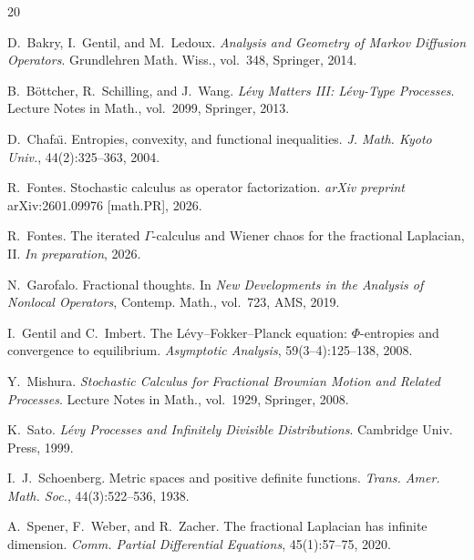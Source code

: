 \documentclass[11pt,a4paper]{article}
\theoremstyle{plain}
\theoremstyle{definition}
\theoremstyle{remark}
\begin{document}
\begin{thebibliography}{20}

D.~Bakry, I.~Gentil, and M.~Ledoux.
\newblock \emph{Analysis and Geometry of Markov Diffusion Operators}.
\newblock Grundlehren Math. Wiss., vol.~348, Springer, 2014.

B.~B\"ottcher, R.~Schilling, and J.~Wang.
\newblock \emph{L\'evy Matters III: L\'evy-Type Processes}.
\newblock Lecture Notes in Math., vol.~2099, Springer, 2013.

D.~Chafa\"{\i}.
\newblock Entropies, convexity, and functional inequalities.
\newblock \emph{J. Math. Kyoto Univ.}, 44(2):325--363, 2004.

R.~Fontes.
\newblock Stochastic calculus as operator factorization.
\newblock \emph{arXiv preprint} arXiv:2601.09976 [math.PR], 2026.

R.~Fontes.
\newblock The iterated $\Gamma$-calculus and Wiener chaos for the
  fractional Laplacian, II.
\newblock \emph{In preparation}, 2026.

N.~Garofalo.
\newblock Fractional thoughts.
\newblock In \emph{New Developments in the Analysis of Nonlocal Operators},
  Contemp. Math., vol.~723, AMS, 2019.

I.~Gentil and C.~Imbert.
\newblock The {L}\'evy--{F}okker--{P}lanck equation: $\Phi$-entropies
  and convergence to equilibrium.
\newblock \emph{Asymptotic Analysis}, 59(3--4):125--138, 2008.

Y.~Mishura.
\newblock \emph{Stochastic Calculus for Fractional Brownian Motion
  and Related Processes}.
\newblock Lecture Notes in Math., vol.~1929, Springer, 2008.

K.~Sato.
\newblock \emph{L\'evy Processes and Infinitely Divisible Distributions}.
\newblock Cambridge Univ. Press, 1999.

I.~J.~Schoenberg.
\newblock Metric spaces and positive definite functions.
\newblock \emph{Trans. Amer. Math. Soc.}, 44(3):522--536, 1938.

A.~Spener, F.~Weber, and R.~Zacher.
\newblock The fractional {L}aplacian has infinite dimension.
\newblock \emph{Comm. Partial Differential Equations}, 45(1):57--75, 2020.

\end{thebibliography}
\end{document}
